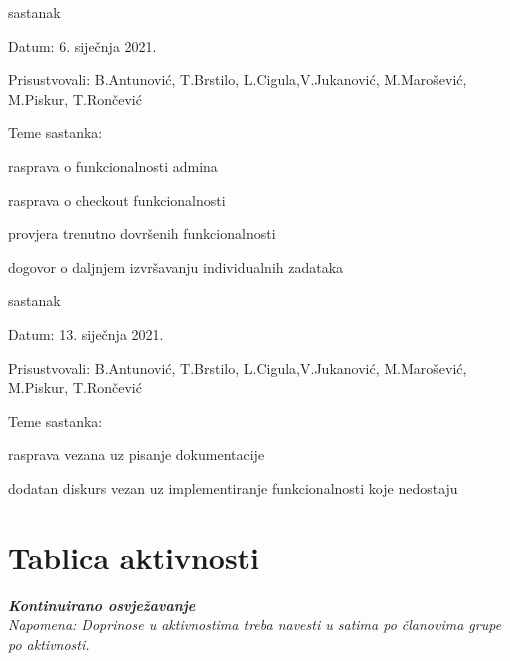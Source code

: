 \begin{packed_enum}
			\item  sastanak
			\item[] \begin{packed_item}
				\item Datum: 6. siječnja 2021.
				\item Prisustvovali: B.Antunović, T.Brstilo, L.Cigula,V.Jukanović, M.Marošević, M.Piskur, T.Rončević
				\item Teme sastanka:
				\begin{packed_item}
					\item  rasprava o funkcionalnosti admina
					\item  rasprava o checkout funkcionalnosti
					\item  provjera trenutno dovršenih funkcionalnosti
					\item  dogovor o daljnjem izvršavanju individualnih zadataka
				\end{packed_item}
			\end{packed_item}
			
			\item  sastanak
			\item[] \begin{packed_item}
				\item Datum: 13. siječnja 2021.
				\item Prisustvovali: B.Antunović, T.Brstilo, L.Cigula,V.Jukanović, M.Marošević, M.Piskur, T.Rončević
				\item Teme sastanka:
				\begin{packed_item}
					\item  rasprava vezana uz pisanje dokumentacije
					\item  dodatan diskurs vezan uz implementiranje funkcionalnosti koje nedostaju
				\end{packed_item}
			\end{packed_item}
			
			
		\end{packed_enum}
		
		\eject
		\section*{Tablica aktivnosti}
		
			\textbf{\textit{Kontinuirano osvježavanje}}\\
			
			 \textit{Napomena: Doprinose u aktivnostima treba navesti u satima po članovima grupe po aktivnosti.}
					
